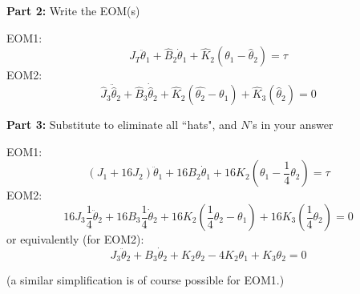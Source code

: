 \begin{ExampleCont}

\noindent
{\bf Part 2:}
Write the EOM(s)


EOM1:
\[
J_T\ddot{\theta}_1 + \hat{B}_2\dot{\theta}_1+\hat{K}_2(\theta_1-\hat{\theta}_2) = \tau
\]
EOM2:
\[
\hat{J}_3\ddot{\hat{\theta}}_2+\hat{B}_3 \dot{\hat{\theta}}_2 + \hat{K}_2(\hat{\theta_2}-{\theta}_1)+\hat{K}_3(\hat{\theta}_2)=0
\]


\noindent
{\bf Part 3:}
Substitute to eliminate all ``hats", and $N$'s in your answer



EOM1:
\[
(J_1+16J_2)\ddot{\theta}_1 + 16B_2\dot{\theta}_1 + 16K_2(\theta_1-\frac{1}{4}\theta_2) = \tau
\]
EOM2:
\[
16J_3\frac{1}{4}\ddot{\theta}_2+16B_3\frac{1}{4}\dot{\theta}_2
+16K_2(\frac{1}{4}\theta_2-\theta_1) + 16K_3(\frac{1}{4}\theta_2) = 0
\]
or equivalently (for EOM2):
\[
J_3\ddot{\theta}_2 + B_3\dot{\theta}_2+K_2\theta_2-4K_2\theta_1 +K_3\theta_2= 0    %
\]

(a similar simplification is of course possible for EOM1.)
\end{ExampleCont}



